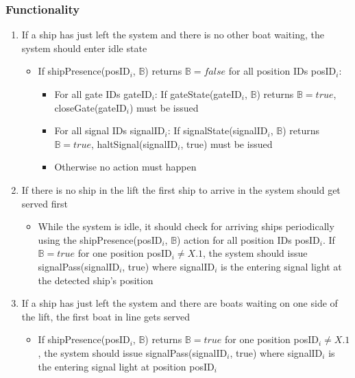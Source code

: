 \subsubsection*{Functionality}
\begin{enumerate}
	\item If a ship has just left the system and there is no other boat waiting, the system should enter idle state
		\begin{itemize}
			\item If shipPresence(posID$_i$, $\mathbb{B}$) returns $\mathbb{B} = false$ for all position IDs posID$_i$:
			\begin{itemize}
				\item For all gate IDs gateID$_i$: If gateState(gateID$_i$, $\mathbb{B}$) returns $\mathbb{B} = true$, closeGate(gateID$_i$) must be issued
				\item For all signal IDs signalID$_i$: If signalState(signalID$_i$, $\mathbb{B}$) returns $\mathbb{B} = true$, haltSignal(signalID$_i$, true) must be issued
				\item Otherwise no action must happen
			\end{itemize}
		\end{itemize}	
	
	\item If there is no ship in the lift the first ship to arrive in the system should get served first
		\begin{itemize}
			\item While the system is idle, it should check for arriving ships periodically using the shipPresence(posID$_i$, $\mathbb{B}$) action for all position IDs posID$_i$. If $\mathbb{B} = true$ for one position posID$_i \neq X.1$, the system should issue signalPass(signalID$_i$, true) where signalID$_i$ is the entering signal light at the detected ship's position
		\end{itemize}
	
	\item If a ship has just left the system and there are boats waiting on one side of the lift, the first boat in line gets served 
		\begin{itemize}
			\item If shipPresence(posID$_i$, $\mathbb{B}$) returns $\mathbb{B} = true$ for one position posID$_i \neq X.1$, the system should issue signalPass(signalID$_i$, true) where signalID$_i$ is the entering signal light at position posID$_i$
		\end{itemize}
		

\end{enumerate}
